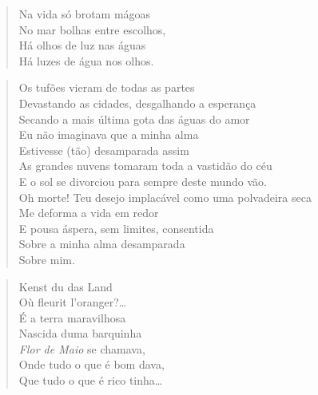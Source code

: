 {\begin{verse}
Na vida só brotam mágoas\\
No mar bolhas entre escolhos,\\
Há olhos de luz nas águas\\
Há luzes de água nos olhos.
\end{verse}


\begin{verse}
Os tufões vieram de todas as partes\\
Devastando as cidades, desgalhando a esperança\\
Secando a mais última gota das águas do amor\\
Eu não imaginava que a minha alma\\
Estivesse (tão) desamparada assim\\
As grandes nuvens tomaram toda a vastidão do céu\\
E o sol se divorciou para sempre deste mundo vão.\\
Oh morte! Teu desejo implacável como uma polvadeira seca\\
Me deforma a vida em redor\\
E pousa áspera, sem limites, consentida\\
Sobre a minha alma desamparada\\
Sobre mim.
\end{verse}



\begin{verse}
Kenst du das Land\\
Où fleurit l'oranger?\ldots{}\\
É a terra maravilhosa\\
Nascida duma barquinha\\
\emph{Flor de Maio} se chamava,\\
Onde tudo o que é bom dava,\\
Que tudo o que é rico tinha\ldots{}


\end{verse}}
